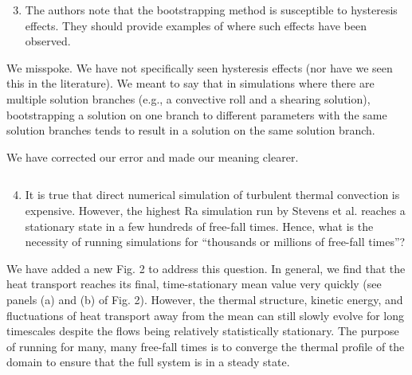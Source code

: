 \documentclass[aps, 11pt, singlecolumn]{revtex4-1} %
\begin{document}
\begin{singlespace}
\begin{myquotation}
$\,$\\\vspace{-1.25cm}
\begin{enumerate}
\setcounter{enumi}{2}
\item The authors note that the bootstrapping method is susceptible to hysteresis effects. They should provide examples of where such effects have been observed.
\end{enumerate}
\end{myquotation}
We misspoke. We have not specifically seen hysteresis effects (nor have we seen
this in the literature).  We meant to say that in simulations where there are
multiple solution branches (e.g., a convective roll and a shearing solution),
bootstrapping a solution on one branch to different parameters with the same
solution branches tends to result in a solution on the 
same solution branch. 

We have corrected our error and made our meaning clearer.

\begin{myquotation}
$\,$\\\vspace{-1.25cm}
\begin{enumerate}
\setcounter{enumi}{3}
\item It is true that direct numerical simulation of turbulent thermal convection is expensive. However, the highest Ra simulation run by Stevens et al. reaches a stationary state in a few hundreds of free-fall times. Hence, what is the necessity of running simulations for ``thousands or millions of free-fall times''?
\end{enumerate}
\end{myquotation}
We have added a new Fig. 2 to address this question. In general, we find that
the heat transport reaches its final, time-stationary mean
value very quickly (see panels (a) and (b) of Fig. 2). However, the thermal 
structure, kinetic energy, and fluctuations of heat transport away from the mean
can still slowly evolve for long timescales
despite the flows being relatively statistically stationary. The purpose of
running for many, many free-fall times is to converge the thermal profile of
the domain to ensure that the full system is in a steady state.


\end{singlespace}
\end{document}
